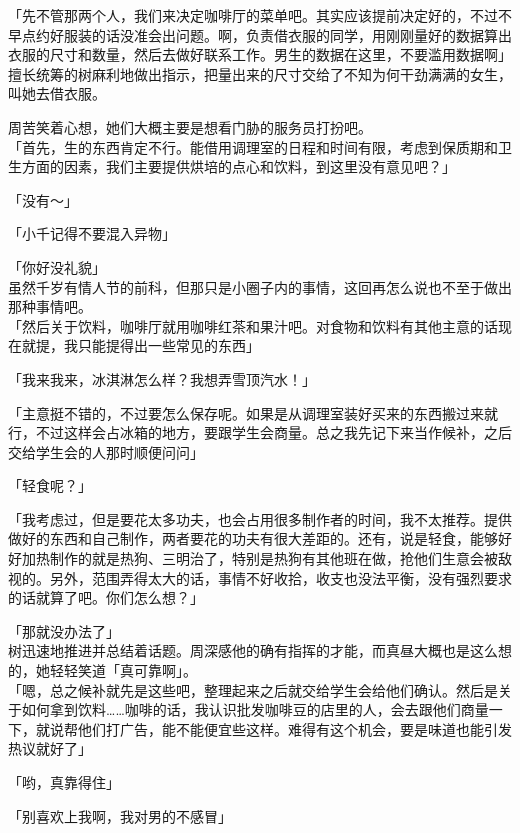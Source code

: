 「先不管那两个人，我们来决定咖啡厅的菜单吧。其实应该提前决定好的，不过不早点约好服装的话没准会出问题。啊，负责借衣服的同学，用刚刚量好的数据算出衣服的尺寸和数量，然后去做好联系工作。男生的数据在这里，不要滥用数据啊」\\

擅长统筹的树麻利地做出指示，把量出来的尺寸交给了不知为何干劲满满的女生，叫她去借衣服。

周苦笑着心想，她们大概主要是想看门胁的服务员打扮吧。\\

「首先，生的东西肯定不行。能借用调理室的日程和时间有限，考虑到保质期和卫生方面的因素，我们主要提供烘培的点心和饮料，到这里没有意见吧？」

「没有～」

「小千记得不要混入异物」

「你好没礼貌」\\

虽然千岁有情人节的前科，但那只是小圈子内的事情，这回再怎么说也不至于做出那种事情吧。\\

「然后关于饮料，咖啡厅就用咖啡红茶和果汁吧。对食物和饮料有其他主意的话现在就提，我只能提得出一些常见的东西」

「我来我来，冰淇淋怎么样？我想弄雪顶汽水！」

「主意挺不错的，不过要怎么保存呢。如果是从调理室装好买来的东西搬过来就行，不过这样会占冰箱的地方，要跟学生会商量。总之我先记下来当作候补，之后交给学生会的人那时顺便问问」

「轻食呢？」

「我考虑过，但是要花太多功夫，也会占用很多制作者的时间，我不太推荐。提供做好的东西和自己制作，两者要花的功夫有很大差距的。还有，说是轻食，能够好好加热制作的就是热狗、三明治了，特别是热狗有其他班在做，抢他们生意会被敌视的。另外，范围弄得太大的话，事情不好收拾，收支也没法平衡，没有强烈要求的话就算了吧。你们怎么想？」

「那就没办法了」\\

树迅速地推进并总结着话题。周深感他的确有指挥的才能，而真昼大概也是这么想的，她轻轻笑道「真可靠啊」。\\

「嗯，总之候补就先是这些吧，整理起来之后就交给学生会给他们确认。然后是关于如何拿到饮料……咖啡的话，我认识批发咖啡豆的店里的人，会去跟他们商量一下，就说帮他们打广告，能不能便宜些这样。难得有这个机会，要是味道也能引发热议就好了」

「哟，真靠得住」

「别喜欢上我啊，我对男的不感冒」\\

